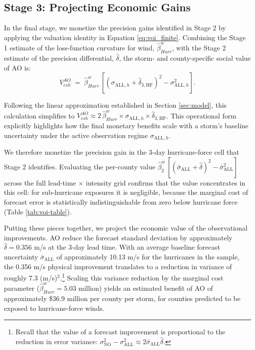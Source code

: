 \documentclass[12pt]{article}%
\begin{document}
\subsection{Stage 3: Projecting Economic Gains}

In the final stage, we monetize the precision gains identified in Stage 2 by applying the valuation identity in Equation \eqref{eq:voi_finite}. Combining the Stage 1 estimate of the loss-function curvature for wind, $\hat{\beta}^w_{Hurr}$, with the Stage 2 estimate of the precision differential, $\hat{\delta}$, the storm- and county-specific social value of AO is:
\begin{equation} \label{eq:value_calc}
     V^{AO}_{csh} \;=\; \hat{\beta}^w_{Hurr} \,\left[(\sigma_{\text{ALL},h} + \hat{\delta}_{3,\text{HF}})^{2} - \sigma_{\text{ALL},h}^{2}\right].
\end{equation}

Following the linear approximation established in Section \ref{sec:model}, this calculation simplifies to $V^{AO}_{csh} \approx 2\,\hat{\beta}^w_{Hurr}\times\sigma_{\text{ALL},h}\times\hat{\delta}_{3,\text{HF}}$. This operational form explicitly highlights how the final monetary benefits scale with a storm's baseline uncertainty under the active observation regime $\sigma_{\text{ALL},h}$.

We therefore monetize the precision gain in the 3-day hurricane-force cell that Stage 2 identifies. Evaluating the per-county value $\hat{\beta}^w_2\,[(\bar{\sigma}_{\text{ALL}}+\hat{\delta})^2 - \bar{\sigma}_{\text{ALL}}^2]$ across the full lead-time $\times$ intensity grid confirms that the value concentrates in this cell: for sub-hurricane exposures it is negligible, because the marginal cost of forecast error is statistically indistinguishable from zero below hurricane force (Table \ref{tab:voi-table}).

Putting these pieces together, we project the economic value of the observational improvements. AO reduce the forecast standard deviation by approximately $\hat{\delta} = 0.356$ m/s at the 3-day lead time. With an average baseline forecast uncertainty $\bar{\sigma}_{\text{ALL}}$ of approximately 10.13 m/s for the hurricanes in the sample, the 0.356 m/s physical improvement translates to a reduction in variance of roughly 7.3 (m/s)$^2$.\footnote{Recall that the value of a forecast improvement is proportional to the reduction in error variance: $\sigma_{\text{NO}}^{2} - \sigma_{\text{ALL}}^{2} \approx 2\bar{\sigma}_{\text{ALL}}\hat{\delta}$.} Scaling this variance reduction by the marginal cost parameter ($\hat{\beta}^w_{Hurr} = 5.03$ million) yields an estimated benefit of AO of approximately \$36.9 million per county per storm, for counties predicted to be exposed to hurricane-force winds.
\end{document}
